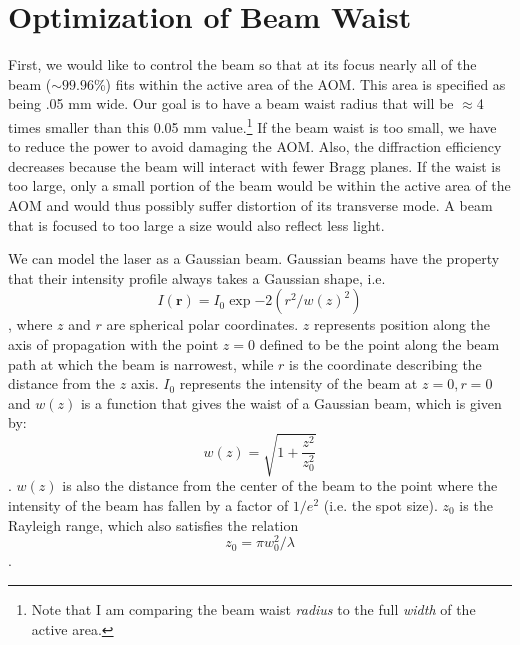 \section{Optimization of Beam Waist}
First, we would like to control the beam so that at its focus nearly all of the beam ($\sim99.96$\%) fits within the active area of the AOM.
This area is specified as being .05 mm wide. Our goal is to have a beam waist radius that will be $\approx$4 times smaller than this 0.05 mm value.\footnote{Note that I am comparing the beam waist \emph{radius} to the full \emph{width} of the active area.} %
If the beam waist is too small, we have to reduce the power to avoid damaging the AOM. Also, the diffraction efficiency decreases because the beam will interact with fewer Bragg planes. If the waist is too large, only a small portion of the beam would be within the active area of the AOM and would thus possibly suffer distortion of its transverse mode. A beam that is focused to too large a size would also reflect less light.

We can model the laser as a Gaussian beam. Gaussian beams have the property that their intensity profile always takes a Gaussian shape, i.e. \cite{lasersMilonniEberly}
\begin{equation}
    I(\mathbf{r})=I_0\exp{-2(r^2/w(z)^2)}
\end{equation},
where $z$ and $r$ are spherical polar coordinates. $z$ represents position along the axis of propagation with the point $z=0$ defined to be the point along the beam path at which the beam is narrowest, while $r$ is the coordinate describing the distance from the $z$ axis. $I_0$ represents the intensity of the beam at $z=0, r=0$ and $w(z)$ is a function that gives the waist of a Gaussian beam, which is given by:
\begin{equation}
w(z)=\sqrt{1+\frac{z^2}{z_0^2}}\label{beamwaist1D}
\end{equation}.
$w(z)$ is also the distance from the center of the beam to the point where the intensity of the beam has fallen by a factor of $1/e^2$ (i.e. the spot size). $z_0$ is the Rayleigh range, which also satisfies the relation 
\begin{equation}
z_0=\pi w_0^2/\lambda \label{rayleighRange1D}
\end{equation}.

